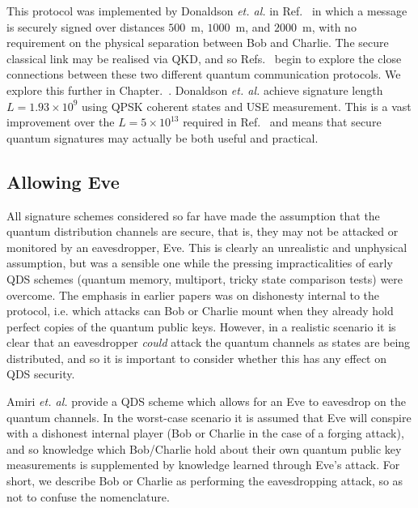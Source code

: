 This protocol was implemented by Donaldson \emph{et. al.} in Ref.~\cite{Donaldson2016} in which a message is securely signed over distances $500$~m, $1000$~m, and $2000$~m, with no requirement on the physical separation between Bob and Charlie. The secure classical link may be realised via QKD, and so Refs.~\cite{Wallden2015, Donaldson2016} begin to explore the close connections between these two different quantum communication protocols. We explore this further in Chapter.~. Donaldson \emph{et. al.} achieve signature length $L = 1.93 \times 10^9$ using QPSK coherent states and USE measurement. This is a vast improvement over the $L = 5 \times 10^{13}$ required in Ref.~\cite{Collins2014} and means that secure quantum signatures may actually be both useful and practical. 

\subsection*{Allowing Eve}
All signature schemes considered so far have made the assumption that the quantum distribution channels are secure, that is, they may not be attacked or monitored by an eavesdropper, Eve. This is clearly an unrealistic and unphysical assumption, but was a sensible one while the pressing impracticalities of early QDS schemes (quantum memory, multiport, tricky state comparison tests) were overcome. The emphasis in earlier papers was on dishonesty internal to the protocol, i.e. which attacks can Bob or Charlie mount when they already hold perfect copies of the quantum public keys. However, in a realistic scenario it is clear that an eavesdropper \emph{could} attack the quantum channels as states are being distributed, and so it is important to consider whether this has any effect on QDS security.

Amiri \emph{et. al.} provide a QDS scheme which allows for an Eve to eavesdrop on the quantum channels. In the worst-case scenario it is assumed that Eve will conspire with a dishonest internal player (Bob or Charlie in the case of a forging attack), and so knowledge which Bob/Charlie hold about their own quantum public key measurements is supplemented by knowledge learned through Eve's attack. For short, we describe Bob or Charlie as performing the eavesdropping attack, so as not to confuse the nomenclature. 

